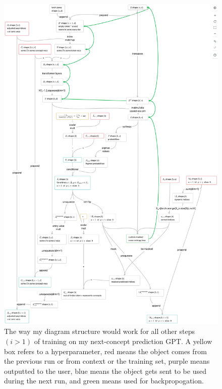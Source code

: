 \documentclass{article}
\begin{document}
\newpage
\begin{figure}[!htb]
    \centering
    \includegraphics[height=0.9\textheight]{NCP_i>1_train.png}
    \caption{The way my diagram structure would work for all other steps $(i>1)$ of training on my next-concept prediction GPT. A yellow box refers to a hyperparameter, red means the object comes from the previous run or from context or the training set, purple means outputted to the user, blue means the object gets sent to be used during the next run, and green means used for backpropogation.}
    \label{fig:ncp_i>1_train}
\end{figure}



\newpage
\end{document}
